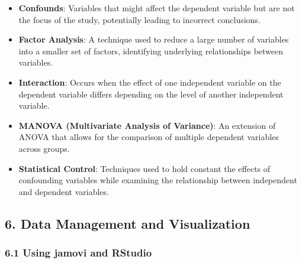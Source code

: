 \documentclass[
]{book}
\providecommand{\tightlist}{%
  \setlength{\itemsep}{0pt}\setlength{\parskip}{0pt}}
\begin{document}
\begin{itemize}
\tightlist
\item
  \textbf{Confounds}: Variables that might affect the dependent variable but are not the focus of the study, potentially leading to incorrect conclusions.
\item
  \textbf{Factor Analysis}: A technique used to reduce a large number of variables into a smaller set of factors, identifying underlying relationships between variables.
\item
  \textbf{Interaction}: Occurs when the effect of one independent variable on the dependent variable differs depending on the level of another independent variable.
\item
  \textbf{MANOVA (Multivariate Analysis of Variance)}: An extension of ANOVA that allows for the comparison of multiple dependent variables across groups.
\item
  \textbf{Statistical Control}: Techniques used to hold constant the effects of confounding variables while examining the relationship between independent and dependent variables.
\end{itemize}

\subsection*{\texorpdfstring{6. \textbf{Data Management and Visualization}}{6. Data Management and Visualization}}\label{data-management-and-visualization}

\subsubsection*{\texorpdfstring{\textbf{6.1 Using jamovi and RStudio}}{6.1 Using jamovi and RStudio}}\label{using-jamovi-and-rstudio}
\end{document}
